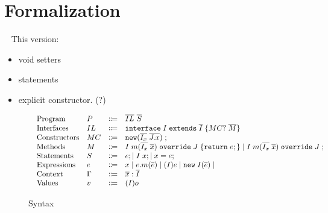 \section{Formalization}~\label{sec:formalization}
This version:
\begin{itemize}
	\item void setters
	\item statements
	\item explicit constructor. (?)
\end{itemize}
\begin{figure*}
	\saveSpaceFig
	\begin{displaymath}
		\begin{array}{l}
			\begin{array}{llrl}
				\text{Program}		& P & \Coloneqq  & \overline{IL} \ \overline{S}  \\
				\text{Interfaces}   & IL & \Coloneqq & \texttt{interface} \; I \; \texttt{extends} \; \overline{I} \; {\{} MC? \; \overline{M} {\}} \\
				\text{Constructors} & MC & \Coloneqq & \texttt{new} (\overline{I_x} \; \overline{J.x}) \; ; \\
				\text{Methods}      & M  & \Coloneqq & I \; m (\overline{I_x} \; \overline{x}) \; \texttt{override} \; J \; {\{} \texttt{return} \; e ; {\}}  \mid
													   I \; m (\overline{I_x} \; \overline{x}) \; \texttt{override} \; J \; ; \\
				\text{Statements}   & S & \Coloneqq  & e; \mid I \; x; \mid x = e; \\
				\text{Expressions}  & e  & \Coloneqq & 
				x \mid
				e.m(\overline{e}) \mid
				(I)e \mid 
				\texttt{new} \; I(\overline{e}) \mid \\
				\text{Context}      & \Gamma & \Coloneqq & \overline{x}:\overline{I} \\
				\text{Values}       & v & \Coloneqq & (I)o \\
			\end{array}
		\end{array}
	\end{displaymath}
	\caption{Syntax}\label{fig:syntax}
	\saveSpaceFig
\end{figure*}

%		
	
